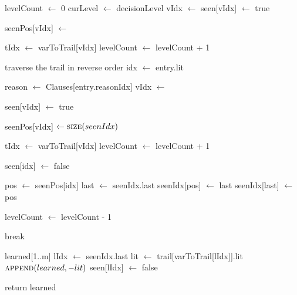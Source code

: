 \begin{algorithm}[H]
\caption{Improved-improved First UIP}\label{alg:35}
\begin{algorithmic}[1]

\State levelCount $\gets$ 0
\State curLevel $\gets$ decisionLevel
        \State vIdx $\gets$ 
        \State seen[vIdx] $\gets$ true 

        \State {}
        \State seenPos[vIdx] $\gets$ 

        \State tIdx $\gets$ varToTrail[vIdx]
            \State levelCount $\gets$ levelCount + 1
        \EndIf
    \EndIf
\EndFor

 \Comment traverse the trail in reverse order
    \State idx $\gets$ entry.lit
    
        \State reason $\gets$ Clauses[entry.reasonIdx]
            \State vIdx $\gets$ 

                \State seen[vIdx] $\gets$ true 

                \State {}
                \State seenPos[vIdx] $\gets \Call{size}{seenIdx}$

                \State tIdx $\gets$ varToTrail[vIdx]
                    \State levelCount $\gets$ levelCount + 1
                \EndIf
            \EndIf
        \EndFor

        \State seen[idx] $\gets$ false

        \State pos $\gets$ seenPos[idx]
        \State last $\gets$ seenIdx.last
        \State seenIdx[pos] $\gets$ last
        \State seenIdx[last] $\gets$ pos

        \State {}

        \State levelCount $\gets$ levelCount - 1
    \EndIf

        \State break
    \EndIf
\EndFor

\State learned[1..m]
    \State lIdx $\gets$ seenIdx.last
    \State lit $\gets$ trail[varToTrail[lIdx]].lit
    \State $\Call{append}{learned, -lit}$
    \State seen[lIdx] $\gets$ false
    \State {}
\EndWhile

\State return learned

\EndProcedure
\end{algorithmic}
\end{algorithm}

